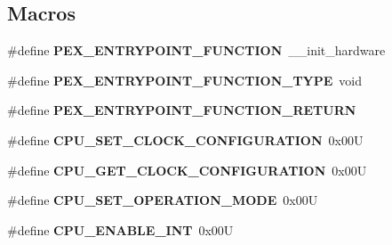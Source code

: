 \subsection*{Macros}
\begin{DoxyCompactItemize}
\item 
\#define {\bfseries P\+E\+X\+\_\+\+E\+N\+T\+R\+Y\+P\+O\+I\+N\+T\+\_\+\+F\+U\+N\+C\+T\+I\+ON}~\+\_\+\+\_\+init\+\_\+hardware\hypertarget{group___c_p_u___config__module_ga8e901544755f3fcb73aea2a77045e6c4}{}\label{group___c_p_u___config__module_ga8e901544755f3fcb73aea2a77045e6c4}

\item 
\#define {\bfseries P\+E\+X\+\_\+\+E\+N\+T\+R\+Y\+P\+O\+I\+N\+T\+\_\+\+F\+U\+N\+C\+T\+I\+O\+N\+\_\+\+T\+Y\+PE}~void\hypertarget{group___c_p_u___config__module_gacd482a10716a72bef89a6d74c9b7df39}{}\label{group___c_p_u___config__module_gacd482a10716a72bef89a6d74c9b7df39}

\item 
\#define {\bfseries P\+E\+X\+\_\+\+E\+N\+T\+R\+Y\+P\+O\+I\+N\+T\+\_\+\+F\+U\+N\+C\+T\+I\+O\+N\+\_\+\+R\+E\+T\+U\+RN}\hypertarget{group___c_p_u___config__module_ga20a3a8a52940662decea23945081d5f5}{}\label{group___c_p_u___config__module_ga20a3a8a52940662decea23945081d5f5}

\item 
\#define {\bfseries C\+P\+U\+\_\+\+S\+E\+T\+\_\+\+C\+L\+O\+C\+K\+\_\+\+C\+O\+N\+F\+I\+G\+U\+R\+A\+T\+I\+ON}~0x00U\hypertarget{group___c_p_u___config__module_ga5810027797727f8d640da76f1fe9d6ec}{}\label{group___c_p_u___config__module_ga5810027797727f8d640da76f1fe9d6ec}

\item 
\#define {\bfseries C\+P\+U\+\_\+\+G\+E\+T\+\_\+\+C\+L\+O\+C\+K\+\_\+\+C\+O\+N\+F\+I\+G\+U\+R\+A\+T\+I\+ON}~0x00U\hypertarget{group___c_p_u___config__module_gaf178d67eea13c0cb571d1c931fd0a1c3}{}\label{group___c_p_u___config__module_gaf178d67eea13c0cb571d1c931fd0a1c3}

\item 
\#define {\bfseries C\+P\+U\+\_\+\+S\+E\+T\+\_\+\+O\+P\+E\+R\+A\+T\+I\+O\+N\+\_\+\+M\+O\+DE}~0x00U\hypertarget{group___c_p_u___config__module_gaad94c951a7d8b11bce43d83d4a5e605c}{}\label{group___c_p_u___config__module_gaad94c951a7d8b11bce43d83d4a5e605c}

\item 
\#define {\bfseries C\+P\+U\+\_\+\+E\+N\+A\+B\+L\+E\+\_\+\+I\+NT}~0x00U\hypertarget{group___c_p_u___config__module_gaaf336a9def5e6d5762d6b9e65ab7b76a}{}\label{group___c_p_u___config__module_gaaf336a9def5e6d5762d6b9e65ab7b76a}


\end{DoxyCompactItemize}
